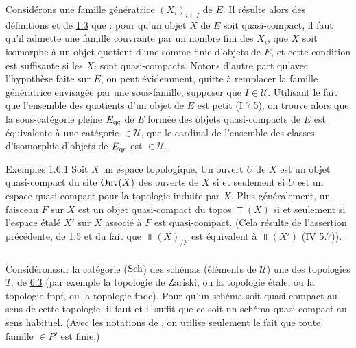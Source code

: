 \documentclass[10pt]{../fichiers-configuration-latex/smfart}
\begin{document}
\subsubsection{}
Considérons une famille génératrice $(X_i)_{i \in I}$ de $E$. Il
résulte alors des définitions et de \hyperref[VI.prop1.3]{1.3} que : pour
qu'un objet $X$ de $E$ soit quasi-compact, il faut qu'il admette une
famille couvrante par un nombre fini des $X_i$, \ie que $X$ soit
isomorphe à un objet quotient d'une somme finie d'objets de $E$, et
cette condition est suffisante si les $X_i$ sont quasi-compacts.
Notons d'autre part qu'avec l'hypothèse faite sur $E$, on peut
évidemment, quitte à remplacer la famille génératrice envisagée par
une sous-famille, supposer que $I \in 𝒰$. Utilisant le fait
que l'ensemble des quotients d'un objet de $E$ est petit (I 7.5), on
trouve alors que la sous-catégorie pleine $E_{\mathrm{qc}}$ de $E$ formée
des objets quasi-compacts de $E$ est équivalente à une catégorie
$\in 𝒰$, \ie que le cardinal de l'ensemble des classes
d'isomorphie d'objets de $E_{\mathrm{qc}}$ est $\in 𝒰$.

\begin{enonce*}[remark]{Exemples 1.6.1}
Soit $X$ un espace topologique. Un ouvert $U$ de $X$ est un objet
quasi-compact du site $\operatorname{Ouv}(X)$ des ouverts de $X$ si et seulement si
$U$ est un espace quasi-compact pour la topologie induite par
$X$. Plus généralement, un faisceau $F$ sur $X$ est un objet
quasi-compact du topos $\Top(X)$ si et seulement si l'espace étalé $X'$
sur $X$ associé à $F$ est quasi-compact. (Cela résulte de l'assertion
précédente, de 1.5 et du fait que $\Top (X)_{/F}$ est équivalent à
$\Top(X')$ (IV 5.7)).
\end{enonce*}

\setcounter{subsection}{6}
\setcounter{subsubsection}{1}
\subsubsection{}
Considérons\pageoriginale sur la catégorie ($\operatorname{Sch}$) des schémas
(éléments de $𝒰$)
une des topologies $T_i$ de \cite{SGA4-06:6} \hyperref[VI.def6.3]{6.3} (par exemple la topologie de
Zariski, ou la topologie étale, ou la topologie fppf, ou la topologie
fpqc). Pour qu'un schéma soit quasi-compact au sens de cette
topologie, il faut et il suffit que ce soit un schéma quasi-compact au
sens habituel. (Avec les notations de \loccit, on utilise seulement le
fait que toute famille $\in P'$ est finie.)
\end{document}
